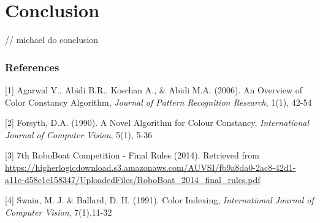 \documentclass{article} %
\begin{document}
\section{Conclusion}

// michael do conclusion

\subsubsection*{References}



\small{
[1]  Agarwal V., Abidi B.R., Koschan A., \& Abidi M.A. (2006). An Overview of Color Constancy Algorithm, {\it Journal of Pattern Recognition Research}, 1(1), 42-54

[2] Forsyth, D.A. (1990). A Novel Algorithm for Colour Constancy, {\it International Journal of Computer Vision}, 5(1), 5-36

[3]  7th RoboBoat Competition - Final Rules (2014). Retrieved from
\url{https://higherlogicdownload.s3.amazonaws.com/AUVSI/fb9a8da0-2ac8-42d1-a11e-d58c1e158347/UploadedFiles/RoboBoat_2014_final_rules.pdf}

[4] Swain, M. J. \& Ballard, D. H. (1991). Color Indexing, {\it International Journal of Computer Vision}, 7(1),11-32



}
\end{document}

